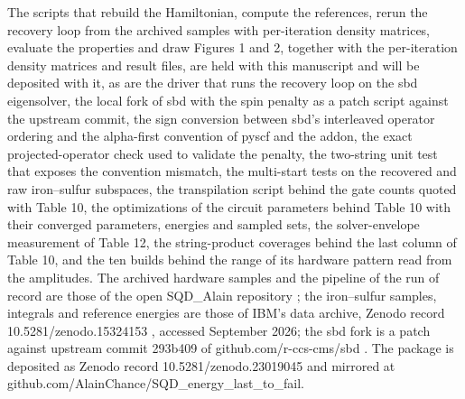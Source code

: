 \documentclass[11pt]{article}
\begin{document}
The scripts that rebuild the Hamiltonian, compute the references, rerun the recovery loop from the archived samples with per-iteration density matrices, evaluate the properties and draw Figures 1 and 2, together with the per-iteration density matrices and result files, are held with this manuscript and will be deposited with it, as are the driver that runs the recovery loop on the sbd eigensolver, the local fork of sbd with the spin penalty as a patch script against the upstream commit, the sign conversion between sbd's interleaved operator ordering and the alpha-first convention of pyscf and the addon, the exact projected-operator check used to validate the penalty, the two-string unit test that exposes the convention mismatch, the multi-start tests on the recovered and raw iron--sulfur subspaces, the transpilation script behind the gate counts quoted with Table 10, the optimizations of the circuit parameters behind Table 10 with their converged parameters, energies and sampled sets, the solver-envelope measurement of Table 12, the string-product coverages behind the last column of Table 10, and the ten builds behind the range of its hardware pattern read from the amplitudes. The archived hardware samples and the pipeline of the run of record are those of the open SQD\_Alain repository \cite{SQDAlain}; the iron--sulfur samples, integrals and reference energies are those of IBM's data archive, Zenodo record 10.5281/zenodo.15324153 \cite{IBMdata}, accessed September 2026; the sbd fork is a patch against upstream commit 293b409 of github.com/r-ccs-cms/sbd \cite{sbd}. The package is deposited as Zenodo record 10.5281/zenodo.23019045 and mirrored at github.com/AlainChance/SQD\_energy\_last\_to\_fail.
\end{document}
